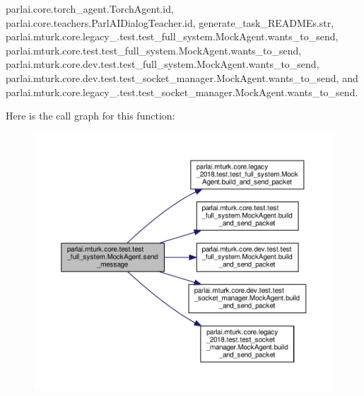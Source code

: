 parlai.\+core.\+torch\+\_\+agent.\+Torch\+Agent.\+id, parlai.\+core.\+teachers.\+Parl\+A\+I\+Dialog\+Teacher.\+id, generate\+\_\+task\+\_\+\+R\+E\+A\+D\+M\+Es.\+str, parlai.\+mturk.\+core.\+legacy\+\_.\+test.\+test\+\_\+full\+\_\+system.\+Mock\+Agent.\+wants\+\_\+to\+\_\+send, parlai.\+mturk.\+core.\+test.\+test\+\_\+full\+\_\+system.\+Mock\+Agent.\+wants\+\_\+to\+\_\+send, parlai.\+mturk.\+core.\+dev.\+test.\+test\+\_\+full\+\_\+system.\+Mock\+Agent.\+wants\+\_\+to\+\_\+send, parlai.\+mturk.\+core.\+dev.\+test.\+test\+\_\+socket\+\_\+manager.\+Mock\+Agent.\+wants\+\_\+to\+\_\+send, and parlai.\+mturk.\+core.\+legacy\+\_.\+test.\+test\+\_\+socket\+\_\+manager.\+Mock\+Agent.\+wants\+\_\+to\+\_\+send.

Here is the call graph for this function\+:
\nopagebreak
\begin{figure}[H]
\begin{center}
\leavevmode
\includegraphics[width=350pt]{classparlai_1_1mturk_1_1core_1_1test_1_1test__full__system_1_1MockAgent_a6eaaac34d4b7644c88bab53eeb12ebb1_cgraph}
\end{center}
\end{figure}
\mbox{\label{classparlai_1_1mturk_1_1core_1_1test_1_1test__full__system_1_1MockAgent_a0a286b82f9e0758cdfabf9b7fb51e6b6}} 
